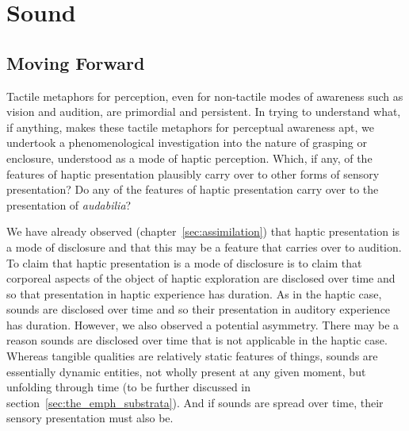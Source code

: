 \chapter{Sound} %
\label{cha:sound}

\section{Moving Forward} %
\label{sec:moving_forward}

Tactile metaphors for perception, even for non-tactile modes of awareness such as vision and audition, are primordial and persistent. In trying to understand what, if anything, makes these tactile metaphors for perceptual awareness apt, we undertook a phenomenological investigation into the nature of grasping or enclosure, understood as a mode of haptic perception. Which, if any, of the features of haptic presentation plausibly carry over to other forms of sensory presentation? Do any of the features of haptic presentation carry over to the presentation of \emph{audabilia}?

We have already observed (chapter~\ref{sec:assimilation}) that haptic presentation is a mode of disclosure and that this may be a feature that carries over to audition. To claim that haptic presentation is a mode of disclosure is to claim that corporeal aspects of the object of haptic exploration are disclosed over time and so that presentation in haptic experience has duration. As in the haptic case, sounds are disclosed over time and so their presentation in auditory experience has duration. However, we also observed a potential asymmetry. There may be a reason sounds are disclosed over time that is not applicable in the haptic case. Whereas tangible qualities are relatively static features of things, sounds are essentially dynamic entities, not wholly present at any given moment, but unfolding through time (to be further discussed in section~\ref{sec:the_emph_substrata}). And if sounds are spread over time, their sensory presentation must also be.


